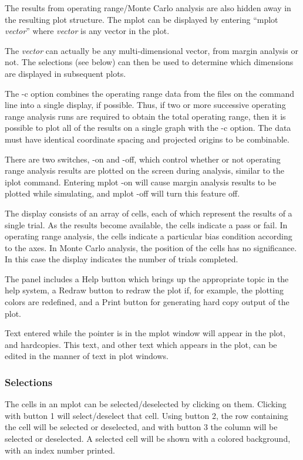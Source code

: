 The results from operating range/Monte Carlo analysis are also hidden
away in the resulting plot structure.  The {\cb mplot} can be displayed by
entering ``{\vt mplot} {\it vector}'' where {\it vector} is any vector
in the plot.

The {\it vector} can actually be any multi-dimensional vector, from
margin analysis or not.  The selections (see below) can then be used
to determine which dimensions are displayed in subsequent plots.

The {\vt -c} option combines the operating range data from the files
on the command line into a single display, if possible.  Thus, if two
or more successive operating range analysis runs are required to
obtain the total operating range, then it is possible to plot all of
the results on a single graph with the {\vt -c} option.  The data must
have identical coordinate spacing and projected origins to be
combinable.

There are two switches, {\vt -on} and {\vt -off}, which control
whether or not operating range analysis results are plotted on the
screen during analysis, similar to the {\cb iplot} command.  Entering
{\vt mplot -on} will cause margin analysis results to be plotted while
simulating, and {\vt mplot -off} will turn this feature off.

The display consists of an array of cells, each of which represent the
results of a single trial.  As the results become available, the cells
indicate a pass or fail.  In operating range analysis, the cells
indicate a particular bias condition according to the axes.  In Monte
Carlo analysis, the position of the cells has no significance.  In
this case the display indicates the number of trials completed.

The panel includes a {\cb Help} button which brings up the appropriate
topic in the help system, a {\cb Redraw} button to redraw the plot if,
for example, the plotting colors are redefined, and a {\cb Print}
button for generating hard copy output of the plot.

Text entered while the pointer is in the {\cb mplot} window will
appear in the plot, and hardcopies.  This text, and other text which
appears in the plot, can be edited in the manner of text in {\cb plot}
windows.

\subsubsection{Selections}

The cells in an {\cb mplot} can be selected/deselected by clicking on
them.  Clicking with button 1 will select/deselect that cell.  Using
button 2, the row containing the cell will be selected or deselected,
and with button 3 the column will be selected or deselected.  A
selected cell will be shown with a colored background, with an index
number printed.

